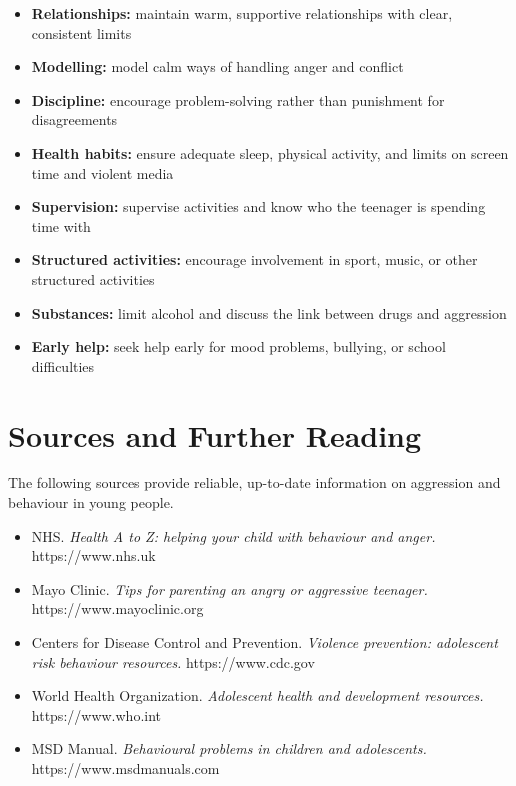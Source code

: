 \begin{itemize}
    \item \textbf{Relationships:} maintain warm, supportive relationships with clear, consistent limits
    \item \textbf{Modelling:} model calm ways of handling anger and conflict
    \item \textbf{Discipline:} encourage problem-solving rather than punishment for disagreements
    \item \textbf{Health habits:} ensure adequate sleep, physical activity, and limits on screen time and violent media
    \item \textbf{Supervision:} supervise activities and know who the teenager is spending time with
    \item \textbf{Structured activities:} encourage involvement in sport, music, or other structured activities
    \item \textbf{Substances:} limit alcohol and discuss the link between drugs and aggression
    \item \textbf{Early help:} seek help early for mood problems, bullying, or school difficulties
\end{itemize}

\section*{Sources and Further Reading}
The following sources provide reliable, up-to-date information on aggression and behaviour in young people.

\begin{itemize}
    \item NHS. \textit{Health A to Z: helping your child with behaviour and anger.} https://www.nhs.uk
    \item Mayo Clinic. \textit{Tips for parenting an angry or aggressive teenager.} https://www.mayoclinic.org
    \item Centers for Disease Control and Prevention. \textit{Violence prevention: adolescent risk behaviour resources.} https://www.cdc.gov
    \item World Health Organization. \textit{Adolescent health and development resources.} https://www.who.int
    \item MSD Manual. \textit{Behavioural problems in children and adolescents.} https://www.msdmanuals.com
\end{itemize}
